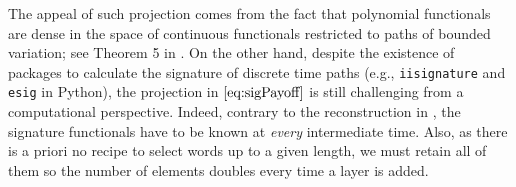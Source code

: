      The appeal of such projection comes from the fact that polynomial functionals are dense in the space of continuous functionals restricted to  paths of bounded variation; see Theorem 5 in  \cite{LittererOberhauser}.  
     On the other hand, despite the existence of   packages to calculate the signature of discrete time paths (e.g., \texttt{iisignature} and \texttt{esig} in Python), the projection in $\eqref{eq:sigPayoff}$ is still  challenging from a computational perspective. 
     Indeed, contrary to the reconstruction in  , the signature functionals have to be known at \textit{every} intermediate time. Also, as there is a priori no recipe to select words up to a given length,  we must retain all of them so the number of elements doubles every time a layer is added. 
